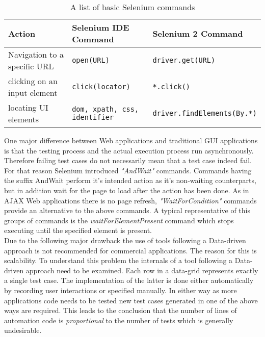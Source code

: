 \documentclass[12pt, notitlepage]{article}
\begin{document}
\begin{table}[H]
	\begin{tabularx}{\textwidth}{l|X|X}
		\textbf{Action} & \textbf{Selenium IDE Command\cite{ide-commands}} & \textbf{Selenium 2 Command\footnotemark\cite{selenium2-commands}} \\
		\hline
		Navigation to a specific URL & \texttt{open(URL)} & \texttt{driver.get(URL)}\\
		clicking on an input element & \texttt{click(locator)} & \texttt{*.click()}\footnotemark\\
		locating UI elements & \texttt{dom, xpath, css, identifier}\footnotemark & \texttt{driver.findElements(By.*)}\footnotemark\\
	\end{tabularx}
	\caption{A list of basic Selenium commands}
	\label{tab:selenium-commands}
\end{table}


One major difference between Web applications and traditional GUI applications is that the testing process and the actual execution process run asynchronously. Therefore failing test cases do not necessarily mean that a test case indeed fail. For that reason 
Selenium introduced \textit{"AndWait"} commands. Commands having the suffix AndWait perform it's intended action as it's
non-waiting counterparts, but in addition wait for the page to load after the action has been done. As in AJAX Web applications there
is no page refresh, \textit{"WaitForCondition"} commands provide an alternative to the above commands. A typical representative of
this groups of commands is the \textit{waitForElementPresent} command which stops executing until the specified element is present.
\\
Due to the following major drawback the use of tools following a Data-driven approach is not recommended for commercial applications. The reason for this
is scalability. To understand this problem the internals of a tool following a Data-driven approach need to be examined. Each row in a data-grid represents exactly 
a single test case. The implementation of the latter is done either automatically by recording user interactions or specified manually.
In either way as more applications code needs to be tested new test cases generated in one of the above ways are required. 
This leads to the conclusion that the number of lines of automation code is \textit{proportional} to the number of tests\cite{record-playback} which is generally 
undesirable. 
\end{document}
